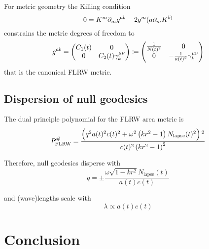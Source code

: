 For metric geometry the Killing condition
\begin{equation}
0=K^m\partial_m g^{ab}-2g{^m(a}\partial_mK^{b)}
\end{equation}
constrains the metric degrees of freedom to
\begin{align}
g^{ab}=\begin{pmatrix}
C_1(t) & 0 \\
0 & C_2(t)\gamma_{k}^{\mu\nu}
\end{pmatrix}
\coloneqq\begin{pmatrix}
\frac{1}{N(t)^2} & 0 \\
0 & -\frac{1}{a(t)^2}\gamma_{k}^{\mu\nu}
\end{pmatrix}
\end{align}
that is the canonical FLRW metric.


\section{Dispersion of null geodesics}

The dual principle polynomial for the FLRW area metric is
\begin{equation}
P^\#_\mathrm{FLRW}=\frac{\left(q^2 a(t)^2 c(t)^2+\omega ^2 \left(k r^2-1\right) N_{\text{lapse}}(t){}^2\right){}^2}{c(t)^2 \left(k r^2-1\right)^2}
\end{equation}

Therefore, null geodesics disperse with
\begin{equation}
q = \pm \frac{\omega  \sqrt{1-k r^2} N_{\text{lapse}}(t)}{a(t) c(t)}
\end{equation}

and (wave)lengths scale with
\begin{equation}
\lambda \propto a(t) c(t)
\end{equation}

\chapter{Conclusion}

